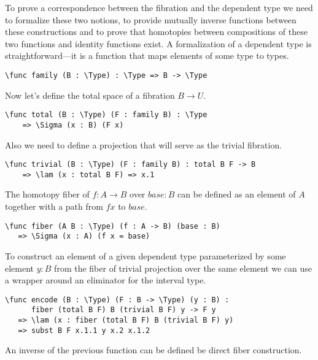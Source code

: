 To prove a correspondence between the fibration and the dependent type we need to formalize these two notions, to provide mutually inverse functions between these constructions and to prove that homotopies between compositions of these two functions and identity functions exist. 
A formalization of a dependent type is straightforward---it is a function that maps elements of some type to types.
\begin{ListingEnv}[H]
\begin{lstlisting}
\func family (B : \Type) : \Type => B -> \Type
\end{lstlisting}
\end{ListingEnv}
Now let's define the total space of a fibration $B \to U$.
\begin{ListingEnv}[H]
\begin{lstlisting}
\func total (B : \Type) (F : family B) : \Type 
	=> \Sigma (x : B) (F x)
\end{lstlisting}
\end{ListingEnv}
Also we need to define a projection that will serve as the trivial fibration.
\begin{ListingEnv}[H]
\begin{lstlisting}
\func trivial (B : \Type) (F : family B) : total B F -> B 
	=> \lam (x : total B F) => x.1
\end{lstlisting}
\end{ListingEnv}
The homotopy fiber of $f : A \to B$ over $base : B$ can be defined as an element of $A$ together with a path from $f x$ to $base$.
\begin{ListingEnv}[H]
\begin{lstlisting}
\func fiber (A B : \Type) (f : A -> B) (base : B)
   => \Sigma (x : A) (f x = base)
\end{lstlisting}
\end{ListingEnv}
To construct an element of a given dependent type parameterized by some element $y : B$ from the fiber of trivial projection over the same element we can use a wrapper around an eliminator for the interval type.   
\begin{ListingEnv}[H]
\begin{lstlisting}
\func encode (B : \Type) (F : B -> \Type) (y : B) :
      fiber (total B F) B (trivial B F) y -> F y
   => \lam (x : fiber (total B F) B (trivial B F) y)
   => subst B F x.1.1 y x.2 x.1.2
\end{lstlisting}
\end{ListingEnv}
An inverse of the previous function can be defined be direct fiber construction. 
